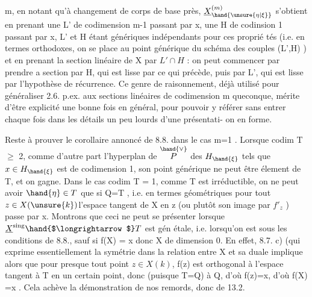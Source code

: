 
\margin{|}m, en notant qu'à changement de corps de base près, $\underline{X}^{(m)}_{\hand{\unsure{\eta|\xi}}}$ s'obtient en
prenant une L' de codimension m-1 passant par x, une H de codinsion
1 passant par x, L' et H étant génériques indépendants pour ces proprié
tés (i.e. en termes orthodoxes, on se place au point générique du 
schéma des couples (L',H)  ) et en prenant la section linéaire
de X par $L'\cap H$ : on peut commencer par prendre a section par H, qui
est lisse par ce qui précède, puis par L', qui est lisse par l'hypothèse
de récurrence. Ce genre de raisonnement, déjà utilisé pour généraliser
2.6. p.ex. aux sections linéaires de codimension m queconque, mérite
d'être explicité une bonne fois en général, pour pouvoir y référer sans
entrer  chaque fois dans les détails un peu lourds d'une présentati-%
on en forme.

Reste à prouver le corollaire annoncé de 8.8. dans le cas m=1 .
Lorsque  codim T $\geqslant$ 2, comme d'autre part l'hyperplan  de $\overset{\hand{\vee}}{P}$ des
$H_{\hand{\xi}}$ tels que $x\in H_{\hand{\xi}}$ est de codimension 1, son point générique \inserted{$\eta$} ne peut
être élement de T, et on gagne. Dans le cas codim T = 1, comme T est
irréductible, on ne peut avoir $\hand{\eta}\in T$ que si Q=T ,
i.e. en termes géométriques   pour tout $z\in X(\unsure{k})$l'espace tangent
de X en z (ou plutôt son image par $f'_{z}$ ) passe par x. Montrons que
ceci ne peut se présenter lorsque $\underline{X}^{\mathrm{sing}}\hand{$\longrightarrow$}T$ est gén étale, i.e.
lorsqu'on est sous les conditions de 8.8., sauf si f(X) = \hand{\{}x\hand{\}} donc X
de dimension 0. En effet, 8.7. c) (qui exprime essentiellement la
symétrie  dans la relation entre X et sa duale \hand{)} implique alors que
pour presque tout point $z\in X(k)$, f(z) est orthogonal à l'espace tangent
à T en un certain point, donc (puisque T=Q)  à Q, d'où f(z)=x, d'où
f(X) =\hand{\{}x\hand{\}} . Cela achève la démonstration de nos remords, donc de 13.2.

